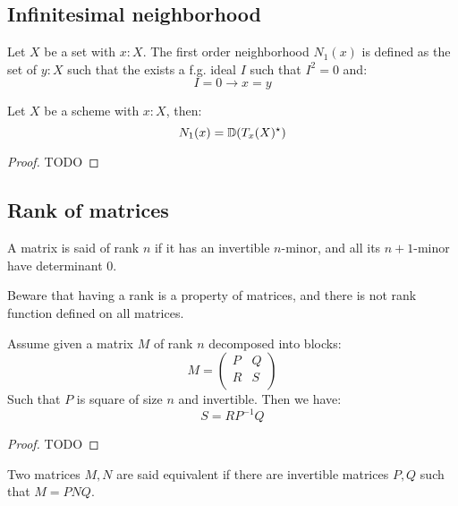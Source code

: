 \subsection{Infinitesimal neighborhood}

\begin{definition}
Let $X$ be a set with $x:X$. The first order neighborhood $N_1(x)$ is defined as the set of $y:X$ such that the exists a f.g. ideal $I$ such that $I^{2}=0$ and:
\[I=0 \to x=y\]
\end{definition}

\begin{lemma}\label{duality-infinitesimal-tangent}
Let $X$ be a scheme with $x:X$, then:
\[N_1(x) = \mathbb{D}(T_x(X)^\star)\]
\end{lemma}

\begin{proof}
TODO
\end{proof}



\subsection{Rank of matrices}

\begin{definition}
A matrix is said of rank $n$ if it has an invertible $n$-minor, and all its $n+1$-minor have determinant $0$.
\end{definition}

Beware that having a rank is a property of matrices, and there is not rank function defined on all matrices.

\begin{lemma}\label{rank-bloc-matrix}
Assume given a matrix $M$ of rank $n$ decomposed into blocks:
\[M = \begin{pmatrix}
P & Q  \\
R & S \\
\end{pmatrix}\]
Such that $P$ is square of size $n$ and invertible. Then we have:
\[S = RP^{-1}Q\]
\end{lemma}

\begin{proof}
TODO
\end{proof}

\begin{definition}
Two matrices $M,N$ are said equivalent if there are invertible matrices $P,Q$ such that $M = PNQ$.
\end{definition}

